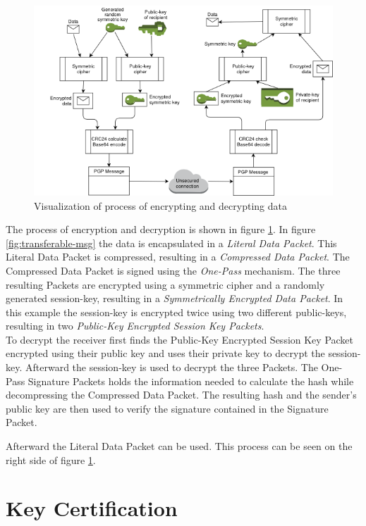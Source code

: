 \begin{figure}[h!]
	\centering
	\includegraphics[width=1\linewidth]{figures/encryption}
	\caption{Visualization of process of encrypting and decrypting data}
	\label{fig:encryption}
\end{figure}


The process of encryption and decryption is shown in figure \ref{fig:encryption}. In figure \ref{fig:transferable-msg} the data is encapsulated in a\textit{ Literal Data Packet}. This Literal Data Packet is compressed, resulting in a \textit{Compressed Data Packet}. The Compressed Data Packet is signed using the \textit{One-Pass} mechanism. The three resulting Packets are encrypted using a symmetric cipher and a randomly generated session-key, resulting in a \textit{Symmetrically Encrypted Data Packet}. In this example the session-key is encrypted twice using two different public-keys, resulting in two \textit{Public-Key Encrypted Session Key Packets}. \\


To decrypt the receiver first finds the Public-Key Encrypted Session Key Packet encrypted using their public key and uses their private key to decrypt the session-key. Afterward the session-key is used to decrypt the three Packets. The One-Pass Signature Packets holds the information needed to calculate the hash while decompressing the Compressed Data Packet. The resulting hash and the sender's public key are then used to verify the signature contained in the Signature Packet. 

Afterward the Literal Data Packet can be used. This process can be seen on the right side of figure \ref{fig:encryption}.

\section{Key Certification}
\label{section:messageformat:cert}

